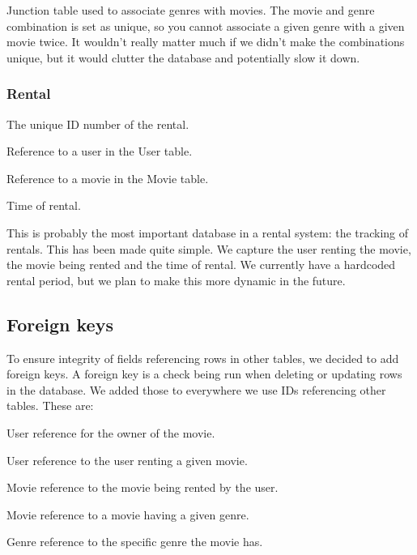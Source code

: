 Junction table used to associate genres with movies. The movie and genre combination is set as unique, so you cannot associate a given genre with a given movie twice. It wouldn't really matter much if we didn't make the combinations unique, but it would clutter the database and potentially slow it down.

\subsubsection{Rental}
\label{Design_Database_Tables_Rental}

\begin{description}\addtolength{\itemsep}{-7pt}
\item[rental\_id] The unique ID number of the rental.
\item[user\_id] Reference to a user in the User table.
\item[movie\_id] Reference to a movie in the Movie table.
\item[time] Time of rental.
\end{description}

This is probably the most important database in a rental system: the tracking of rentals. This has been made quite simple. We capture the user renting the movie, the movie being rented and the time of rental. We currently have a hardcoded rental period, but we plan to make this more dynamic in the future.

\subsection{Foreign keys}
\label{Design_Database_Foreignkeys}
To ensure integrity of fields referencing rows in other tables, we decided to add foreign keys. A foreign key is a check being run when deleting or updating rows in the database. We added those to everywhere we use IDs referencing other tables. These are:

\begin{description}\addtolength{\itemsep}{-7pt}
\item[Movie.user\_id] User reference for the owner of the movie.
\item[Rental.user\_id] User reference to the user renting a given movie.
\item[Rental.movie\_id] Movie reference to the movie being rented by the user.
\item[HasGenre.movie\_id] Movie reference to a movie having a given genre.
\item[HasGenre.genre\_id] Genre reference to the specific genre the movie has.
\end{description}

